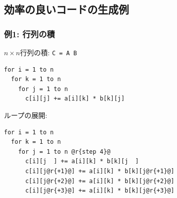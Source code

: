 \documentclass[dvipdfmx,cjk,xcolor=dvipsnames,envcountsect,notheorems,12pt]{beamer}
\theoremstyle{definition}
\begin{document}



\subsection{効率の良いコードの生成例}

\begin{frame}[fragile]
  \frametitle{例1: 行列の積}
  $n \times n$行列の積: \lstinline|C = A B|
\begin{lstlisting}
for i = 1 to n
  for k = 1 to n
    for j = 1 to n
      c[i][j] += a[i][k] * b[k][j]
\end{lstlisting}
  \pause
  ループの展開:
\begin{lstlisting}
for i = 1 to n
  for k = 1 to n
    for j = 1 to n @r{step 4}@
      c[i][j  ] += a[i][k] * b[k][j  ]
      c[i][j@r{+1}@] += a[i][k] * b[k][j@r{+1}@]
      c[i][j@r{+2}@] += a[i][k] * b[k][j@r{+2}@]
      c[i][j@r{+3}@] += a[i][k] * b[k][j@r{+3}@]
\end{lstlisting}
\end{frame}
\end{document}
